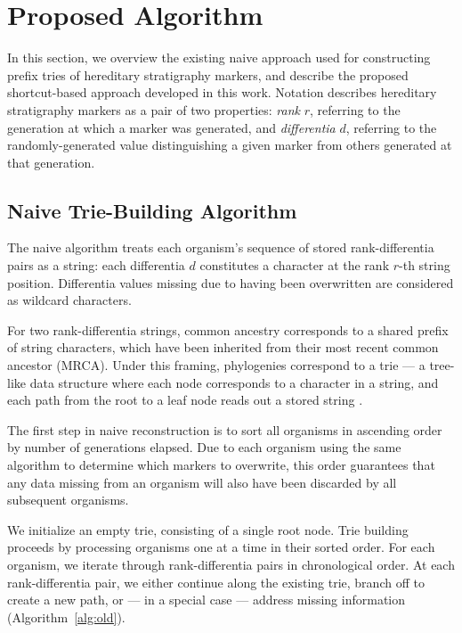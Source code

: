 \section{Proposed Algorithm} \label{sec:algorithm}

In this section, we overview the existing naive approach used for constructing prefix tries of hereditary stratigraphy markers, and describe the proposed shortcut-based approach developed in this work.
Notation describes hereditary stratigraphy markers as a pair of two properties: \textit{rank} $r$, referring to the generation at which a marker was generated, and \textit{differentia} $d$, referring to the randomly-generated value distinguishing a given marker from others generated at that generation.

\subsection{Naive Trie-Building Algorithm} \label{sec:algorithm:naive}

The naive algorithm treats each organism's sequence of stored rank-differentia pairs as a string: each differentia $d$ constitutes a character at the rank $r$-th string position.
Differentia values missing due to having been overwritten are considered as wildcard characters.

For two rank-differentia strings, common ancestry corresponds to a shared prefix of string characters, which have been inherited from their most recent common ancestor (MRCA).
Under this framing, phylogenies correspond to a trie --- a tree-like data structure where each node corresponds to a character in a string, and each path from the root to a leaf node reads out a stored string \citep{fredkin1960trie}.

The first step in naive reconstruction is to sort all organisms in ascending order by number of generations elapsed.
Due to each organism using the same algorithm to determine which markers to overwrite, this order guarantees that any data missing from an organism will also have been discarded by all subsequent organisms.

We initialize an empty trie, consisting of a single root node.
Trie building proceeds by processing organisms one at a time in their sorted order.
For each organism, we iterate through rank-differentia pairs in chronological order.
At each rank-differentia pair, we either continue along the existing trie, branch off to create a new path, or --- in a special case --- address missing information (Algorithm~\ref{alg:old}).

